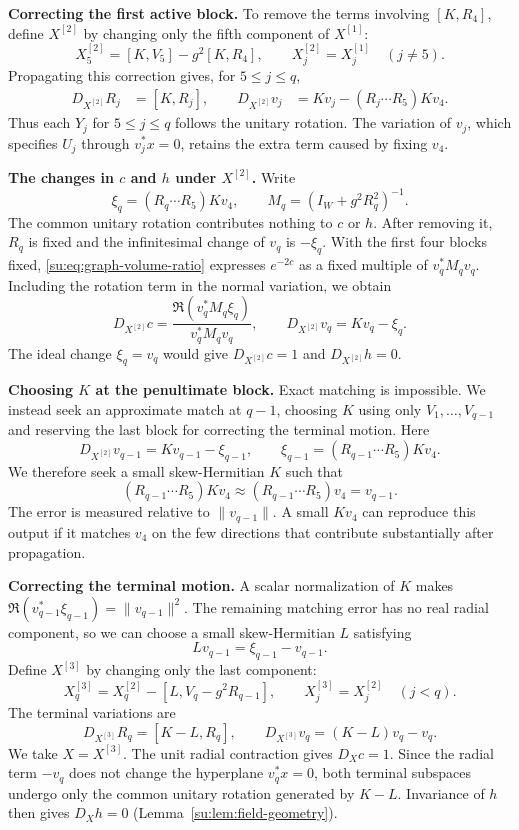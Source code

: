 \documentclass[11pt]{article}
\numberwithin{equation}{section}
\theoremstyle{remark}
\begin{document}
\textbf{Correcting the first active block.}
To remove the terms involving $[K,R_4]$, define $X^{[2]}$ by
changing only the fifth component of $X^{[1]}$:
\[
 X^{[2]}_5=[K,V_5]-g^2[K,R_4],\qquad
 X^{[2]}_j=X^{[1]}_j\quad(j\ne5).
\]
Propagating this correction gives, for $5\le j\le q$,
\[
 \begin{aligned}
 D_{X^{[2]}}R_j&=[K,R_j],\qquad D_{X^{[2]}}v_j&=Kv_j-(R_j\cdots R_5)Kv_4.
 \end{aligned}
\]
Thus each $Y_j$ for $5\le j\le q$ follows the unitary rotation. The
variation of $v_j$, which specifies $U_j$ through $v_j^*x=0$, retains
the extra term caused by fixing $v_4$.

\textbf{The changes in $c$ and $h$ under $X^{[2]}$.}
Write
\[
 \xi_q=(R_q\cdots R_5)Kv_4,\qquad
 M_q=(I_W+g^2R_q^2)^{-1}.
\]
The common unitary rotation contributes nothing to $c$ or $h$.
After removing it, $R_q$ is fixed and the infinitesimal change
of $v_q$ is $-\xi_q$. With the first four blocks fixed,
\eqref{su:eq:graph-volume-ratio} expresses $e^{-2c}$ as a fixed
multiple of $v_q^*M_qv_q$. Including the rotation term in the
normal variation, we obtain
\[
 D_{X^{[2]}}c
 =\frac{\Re(v_q^*M_q\xi_q)}{v_q^*M_qv_q},\qquad
 D_{X^{[2]}}v_q=Kv_q-\xi_q.
\]
The ideal change $\xi_q=v_q$ would give
$D_{X^{[2]}}c=1$ and $D_{X^{[2]}}h=0$.

\textbf{Choosing $K$ at the penultimate block.}
Exact matching is impossible. We instead seek an approximate match
at $q-1$, choosing $K$ using only $V_1,\ldots,V_{q-1}$ and reserving
the last block for correcting the terminal motion. Here
\[
 D_{X^{[2]}}v_{q-1}=Kv_{q-1}-\xi_{q-1},\qquad
 \xi_{q-1}=(R_{q-1}\cdots R_5)Kv_4.
\]
We therefore seek a small skew-Hermitian $K$ such that
\[
 (R_{q-1}\cdots R_5)Kv_4\approx(R_{q-1}\cdots R_5)v_4=v_{q-1}.
\]
The error is measured relative to $\|v_{q-1}\|$. A small $Kv_4$
can reproduce this output if it matches $v_4$ on the few directions
that contribute substantially after propagation.

\textbf{Correcting the terminal motion.}
A scalar normalization of $K$ makes
$\Re(v_{q-1}^*\xi_{q-1})=\|v_{q-1}\|^2$.
The remaining matching error has no real radial component, so we
can choose a small skew-Hermitian $L$ satisfying
\[
 Lv_{q-1}=\xi_{q-1}-v_{q-1}.
\]
Define $X^{[3]}$ by changing only the last component:
\[
 X^{[3]}_q=X^{[2]}_q-[L,V_q-g^2R_{q-1}],\qquad
 X^{[3]}_j=X^{[2]}_j\quad(j<q).
\]
The terminal variations are
\[
 D_{X^{[3]}}R_q=[K-L,R_q],\qquad
 D_{X^{[3]}}v_q=(K-L)v_q-v_q.
\]
We take $X=X^{[3]}$. The unit radial contraction gives $D_Xc=1$.
Since the radial term $-v_q$ does not change the hyperplane
$v_q^*x=0$, both terminal subspaces undergo only the common
unitary rotation generated by $K-L$. Invariance of $h$ then
gives $D_Xh=0$ (Lemma~\ref{su:lem:field-geometry}).
\end{document}
